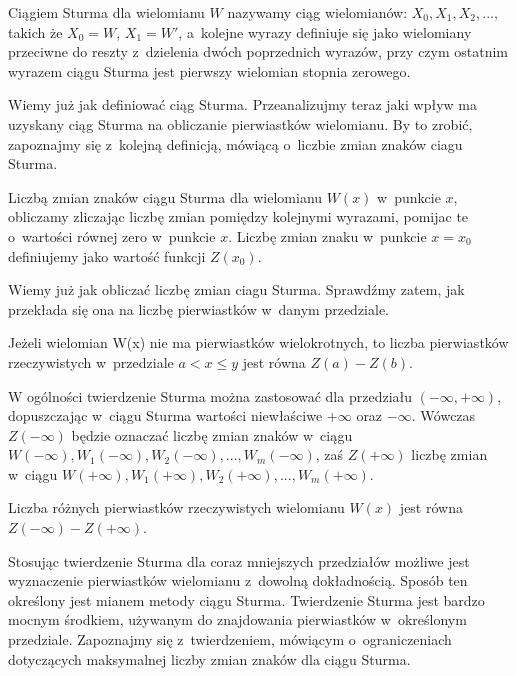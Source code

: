 \begin{definition}
	$ $ \\
	Ciągiem Sturma dla wielomianu $W$ nazywamy ciąg wielomianów: $X_0, X_1, X_2,...$, takich że $X_0=W$, $X_1=W'$, a~kolejne wyrazy definiuje się jako wielomiany przeciwne do reszty z~dzielenia dwóch poprzednich wyrazów, przy czym ostatnim wyrazem ciągu Sturma jest pierwszy wielomian stopnia zerowego. 
\end{definition}

Wiemy już jak definiować ciąg Sturma. Przeanalizujmy teraz jaki wpływ ma uzyskany ciąg Sturma na obliczanie pierwiastków wielomianu. By to zrobić, zapoznajmy się z~kolejną definicją, mówiącą o~liczbie zmian znaków ciagu Sturma.

\begin{definition}
	$ $ \\
	Liczbą zmian znaków ciągu Sturma dla wielomianu $W(x)$ w~punkcie $x$, obliczamy zliczając liczbę zmian pomiędzy kolejnymi wyrazami, pomijac te o~wartości równej zero w~punkcie $x$. Liczbę zmian znaku w~punkcie $x=x_0$ definiujemy jako wartość funkcji $Z(x_0)$.
\end{definition}

Wiemy już jak obliczać liczbę zmian ciagu Sturma. Sprawdźmy zatem, jak przekłada się ona na liczbę pierwiastków w~danym przedziale.

\begin{theorem}
	$ $ \\
	Jeżeli wielomian W(x) nie ma pierwiastków wielokrotnych, to liczba pierwiastków rzeczywistych w~przedziale $a<x\le y$ jest równa $Z(a) - Z(b)$.
\end{theorem}

W ogólności twierdzenie Sturma można zastosować dla przedziału $(-\infty,+\infty)$, dopuszczając w~ciągu Sturma wartości niewłaściwe $+\infty$ oraz $-\infty$. Wówczas $Z(-\infty)$ będzie oznaczać liczbę zmian znaków w~ciągu $W(-\infty), W_1(-\infty), W_2(-\infty),..., W_m(-\infty)$, zaś $Z(+\infty)$ liczbę zmian w~ciągu $W(+\infty), W_1(+\infty), W_2(+\infty),..., W_m(+\infty)$.

\begin{theorem}
	$ $ \\
	Liczba różnych pierwiastków rzeczywistych wielomianu $W(x)$ jest równa $Z(-\infty)-Z(+\infty)$.
\end{theorem}

Stosując twierdzenie Sturma dla coraz mniejszych przedziałów możliwe jest wyznaczenie pierwiastków wielomianu z~dowolną dokładnością. Sposób ten określony jest mianem metody ciągu Sturma.
Twierdzenie Sturma jest bardzo mocnym środkiem, używanym do znajdowania pierwiastków w~określonym przedziale. Zapoznajmy się z~twierdzeniem, mówiącym o~ograniczeniach dotyczących maksymalnej liczby zmian znaków dla ciągu Sturma.

